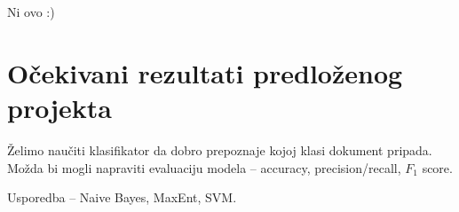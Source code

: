 \documentclass[12pt,a4paper,titlepage]{article}
\begin{document}
Ni ovo :)

\section{Očekivani rezultati predloženog projekta}

Želimo naučiti klasifikator da dobro prepoznaje kojoj klasi dokument pripada. Možda bi mogli napraviti evaluaciju modela -- accuracy, precision/recall, $F_1$ score.

Usporedba -- Naive Bayes, MaxEnt, SVM.

\newpage

\nocite{*}



\end{document}
